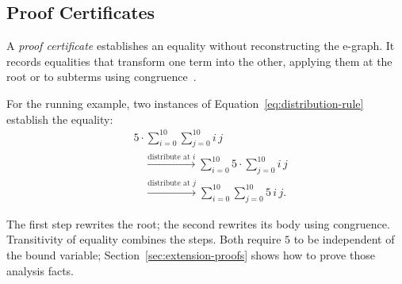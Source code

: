 \subsection{Proof Certificates}
\label{sec:background-certificates}
\label{sec:related-proofs}

A \emph{proof certificate} establishes an equality without reconstructing the e-graph.
It records equalities that transform one term into the other,
  applying them at the root or to subterms using congruence~\cite{eggproof}.

\begin{samepage}
For the running example, two instances of Equation~\ref{eq:distribution-rule}
  establish the equality:
\[
  \begin{aligned}
    &5\cdot\sum_{i=0}^{10}\sum_{j=0}^{10}i\,j\\[4pt]
    &\quad\xrightarrow{\text{distribute at }i}
      \sum_{i=0}^{10}5\cdot\sum_{j=0}^{10}i\,j\\[4pt]
    &\quad\xrightarrow{\text{distribute at }j}
      \sum_{i=0}^{10}\sum_{j=0}^{10}5\,i\,j.
  \end{aligned}
\]
\end{samepage}

The first step rewrites the root; the second rewrites its body using congruence.
Transitivity of equality combines the steps.
Both require $5$ to be independent of the bound variable;
  Section~\ref{sec:extension-proofs} shows how to prove those analysis facts.
